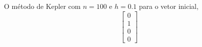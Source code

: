 \documentclass[a4paper,12pt]{article}
\begin{document}
\newpage
O m\'etodo de Kepler com $n = 100$ e $h = 0.1$ para o vetor inicial,
\[\left [ 
	\begin{array}{c}
		0 \\
		1 \\
		0 \\
		0
	\end{array}
\right ] 
\]
\begin{figure}[!h]
	\centering
\end{figure}
\end{document}
